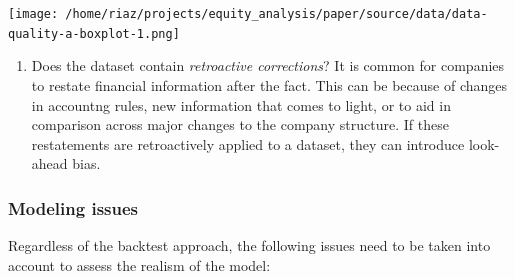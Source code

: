 \documentclass[11pt,preprint, authoryear]{elsarticle}
\let\origfigure\figure
\let\endorigfigure\endfigure
\renewenvironment{figure}[1][2] {
    \expandafter\origfigure\expandafter[H]
} {
    \endorigfigure
}
\numberwithin{equation}{section}
\numberwithin{figure}{section}
\numberwithin{table}{section}
\def\tightlist{} %
\begin{document}
\begin{figure}
\centering
\texttt{[image: /home/riaz/projects/equity\_analysis/paper/source/data/data-quality-a-boxplot-1.png]}
\caption{Data Discrepancies between Google and Yahoo! (Trice
(\protect\hyperlink{ref-Trice2017}{2017}))\label{Table1}}
\end{figure}

\begin{enumerate}
\def\labelenumi{\arabic{enumi})}
\setcounter{enumi}{3}
\tightlist
\item
  Does the dataset contain \emph{retroactive corrections}? It is common
  for companies to restate financial information after the fact. This
  can be because of changes in accountng rules, new information that
  comes to light, or to aid in comparison across major changes to the
  company structure. If these restatements are retroactively applied to
  a dataset, they can introduce look-ahead bias.
\end{enumerate}

\subsubsection{Modeling issues}\label{modeling-issues}

Regardless of the backtest approach, the following issues need to be
taken into account to assess the realism of the model:
\end{document}
